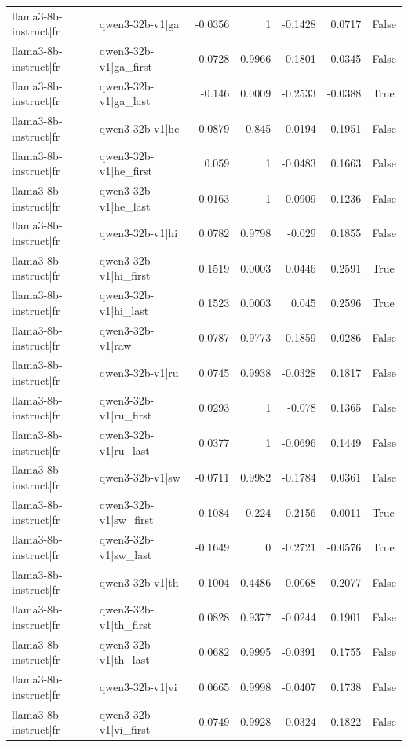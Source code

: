 \begin{table}
\begin{tabular}{l l r r r r l}
llama3-8b-instruct|fr & qwen3-32b-v1|ga & -0.0356 & 1 & -0.1428 & 0.0717 & False \\
llama3-8b-instruct|fr & qwen3-32b-v1|ga_first & -0.0728 & 0.9966 & -0.1801 & 0.0345 & False \\
llama3-8b-instruct|fr & qwen3-32b-v1|ga_last & -0.146 & 0.0009 & -0.2533 & -0.0388 & True \\
llama3-8b-instruct|fr & qwen3-32b-v1|he & 0.0879 & 0.845 & -0.0194 & 0.1951 & False \\
llama3-8b-instruct|fr & qwen3-32b-v1|he_first & 0.059 & 1 & -0.0483 & 0.1663 & False \\
llama3-8b-instruct|fr & qwen3-32b-v1|he_last & 0.0163 & 1 & -0.0909 & 0.1236 & False \\
llama3-8b-instruct|fr & qwen3-32b-v1|hi & 0.0782 & 0.9798 & -0.029 & 0.1855 & False \\
llama3-8b-instruct|fr & qwen3-32b-v1|hi_first & 0.1519 & 0.0003 & 0.0446 & 0.2591 & True \\
llama3-8b-instruct|fr & qwen3-32b-v1|hi_last & 0.1523 & 0.0003 & 0.045 & 0.2596 & True \\
llama3-8b-instruct|fr & qwen3-32b-v1|raw & -0.0787 & 0.9773 & -0.1859 & 0.0286 & False \\
llama3-8b-instruct|fr & qwen3-32b-v1|ru & 0.0745 & 0.9938 & -0.0328 & 0.1817 & False \\
llama3-8b-instruct|fr & qwen3-32b-v1|ru_first & 0.0293 & 1 & -0.078 & 0.1365 & False \\
llama3-8b-instruct|fr & qwen3-32b-v1|ru_last & 0.0377 & 1 & -0.0696 & 0.1449 & False \\
llama3-8b-instruct|fr & qwen3-32b-v1|sw & -0.0711 & 0.9982 & -0.1784 & 0.0361 & False \\
llama3-8b-instruct|fr & qwen3-32b-v1|sw_first & -0.1084 & 0.224 & -0.2156 & -0.0011 & True \\
llama3-8b-instruct|fr & qwen3-32b-v1|sw_last & -0.1649 & 0 & -0.2721 & -0.0576 & True \\
llama3-8b-instruct|fr & qwen3-32b-v1|th & 0.1004 & 0.4486 & -0.0068 & 0.2077 & False \\
llama3-8b-instruct|fr & qwen3-32b-v1|th_first & 0.0828 & 0.9377 & -0.0244 & 0.1901 & False \\
llama3-8b-instruct|fr & qwen3-32b-v1|th_last & 0.0682 & 0.9995 & -0.0391 & 0.1755 & False \\
llama3-8b-instruct|fr & qwen3-32b-v1|vi & 0.0665 & 0.9998 & -0.0407 & 0.1738 & False \\
llama3-8b-instruct|fr & qwen3-32b-v1|vi_first & 0.0749 & 0.9928 & -0.0324 & 0.1822 & False \\

\end{tabular}
\end{table}
